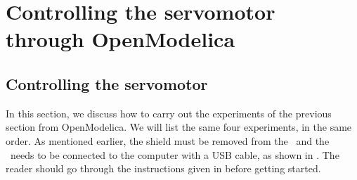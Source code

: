 \section{Controlling the servomotor through OpenModelica}
\subsection{Controlling the servomotor}
\label{sec:servo-OpenModelica}
In this section, we discuss how to carry out the experiments of the
previous section from OpenModelica.  We will list the same four experiments,
in the same order.  As mentioned earlier, the shield must be removed from 
the \arduino\ and the \arduino\ needs to be connected to the computer 
with a USB cable, as shown in . The reader should go through the instructions given in
 before getting started.

